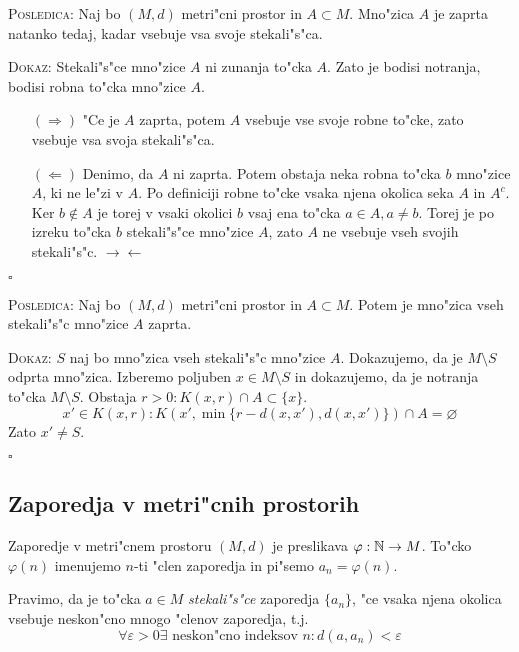 \textsc{Posledica:} Naj bo $(M, d)$ metri"cni prostor in $A \subset M$. Mno"zica $A$ je zaprta natanko tedaj, kadar vsebuje vsa svoje stekali"s"ca.

\textsc{Dokaz:} Stekali"s"ce mno"zice $A$ ni zunanja to"cka $A$. Zato je bodisi notranja, bodisi robna to"cka mno"zice $A$.
\begin{itemize}
    \item[$(\Rightarrow)$] "Ce je $A$ zaprta, potem $A$ vsebuje vse svoje robne to"cke, zato vsebuje vsa svoja stekali"s"ca.
    \item[$(\Leftarrow)$] Denimo, da $A$ ni zaprta. Potem obstaja neka robna to"cka $b$ mno"zice $A$, ki ne le"zi v $A$. Po definiciji robne to"cke vsaka njena okolica seka $A$ in $A^c$. Ker $b \notin A$ je torej v vsaki okolici $b$ vsaj ena to"cka $a \in A, a \neq b$. Torej je po izreku to"cka $b$ stekali"s"ce mno"zice $A$, zato $A$ ne vsebuje vseh svojih stekali"s"c.  $\rightarrow\leftarrow$
\end{itemize}
\hfill $\square$

\textsc{Posledica:} Naj bo $(M, d)$ metri"cni prostor in $A \subset M$. Potem je mno"zica vseh stekali"s"c mno"zice $A$ zaprta.

\textsc{Dokaz:} $S$ naj bo mno"zica vseh stekali"s"c mno"zice $A$. Dokazujemo, da je $M \setminus S$ odprta mno"zica. Izberemo poljuben $x \in M \setminus S$ in dokazujemo, da je notranja to"cka $M \setminus S$. Obstaja $r > 0: K(x, r) \cap A \subset \{ x \}$.
\begin{equation*}
x' \in K(x, r): K(x', \min \{ r - d(x, x'), d(x, x') \} ) \cap A = \varnothing
\end{equation*}
Zato $x' \neq S$.

\hfill $\square$

\subsection{Zaporedja v metri"cnih prostorih}
 Zaporedje v metri"cnem prostoru $(M, d)$ je preslikava $\varphi: \mathbb{N} \to M$. To"cko $\varphi(n)$ imenujemo $n$-ti "clen zaporedja in pi"semo $a_n = \varphi(n)$.

 Pravimo, da je to"cka $a \in M$ \emph{stekali"s"ce} zaporedja $\{ a_n \}$, "ce vsaka njena okolica vsebuje neskon"cno mnogo "clenov zaporedja, t.j.
\begin{equation*}
\forall \varepsilon > 0 \exists \text{ neskon"cno indeksov $n$}: d(a, a_n) < \varepsilon
\end{equation*}

